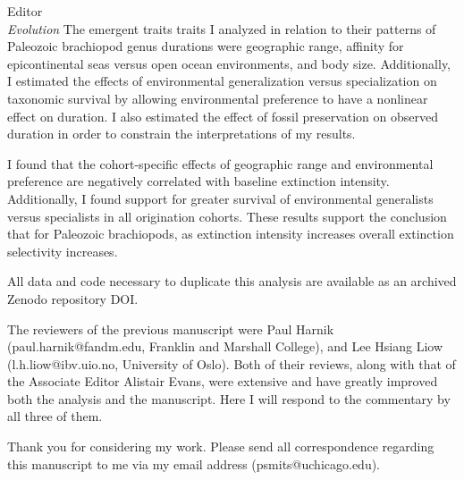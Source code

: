 \documentclass{letter}
\begin{document}
\begin{letter}{Editor \\ \textit{Evolution}}
  The emergent traits traits I analyzed in relation to their patterns of Paleozoic brachiopod genus durations were geographic range, affinity for epicontinental seas versus open ocean environments, and body size. Additionally, I estimated the effects of environmental generalization versus specialization on taxonomic survival by allowing environmental preference to have a nonlinear effect on duration. I also estimated the effect of fossil preservation on observed duration in order to constrain the interpretations of my results. 
  
  I found that the cohort-specific effects of geographic range and environmental preference are negatively correlated with baseline extinction intensity. Additionally, I found support for greater survival of environmental generalists versus specialists in all origination cohorts. These results support the conclusion that for Paleozoic brachiopods, as extinction intensity increases overall extinction selectivity increases.

  All data and code necessary to duplicate this analysis are available as an archived Zenodo repository DOI.

  The reviewers of the previous manuscript were Paul Harnik (paul.harnik@fandm.edu, Franklin and Marshall College), and Lee Hsiang Liow (l.h.liow@ibv.uio.no, University of Oslo). Both of their reviews, along with that of the Associate Editor Alistair Evans, were extensive and have greatly improved both the analysis and the manuscript. Here I will respond to the commentary by all three of them.
  
  Thank you for considering my work. Please send all correspondence regarding this manuscript to me via my email address (psmits@uchicago.edu).


  \clearpage


\end{letter}
\end{document}
